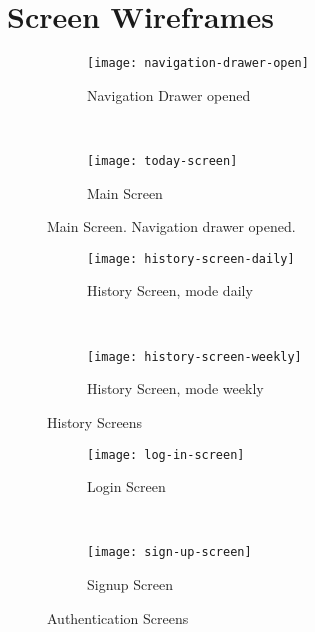 \chapter{Screen Wireframes}



\begin{figure*}[ht]
    \centering
    \begin{subfigure}[t]{0.4\textwidth}
        \centering
        \texttt{[image: navigation-drawer-open]}
        \caption{Navigation Drawer opened}
    \end{subfigure}%
    ~ 
    \begin{subfigure}[t]{0.4\textwidth}
        \centering
        \texttt{[image: today-screen]}
        \caption{Main Screen}
    \end{subfigure}
    \caption{Main Screen. Navigation drawer opened.}
\end{figure*}



\begin{figure*}[ht]
    \centering
    \begin{subfigure}[t]{0.4\textwidth}
        \centering
        \texttt{[image: history-screen-daily]}
        \caption{History Screen, mode daily}
    \end{subfigure}%
    ~ 
    \begin{subfigure}[t]{0.4\textwidth}
        \centering
        \texttt{[image: history-screen-weekly]}
        \caption{History Screen, mode weekly}
    \end{subfigure}
    \caption{History Screens}
\end{figure*}



\begin{figure*}[ht]
    \centering
    \begin{subfigure}[t]{0.4\textwidth}
        \centering
        \texttt{[image: log-in-screen]}
        \caption{Login Screen}
    \end{subfigure}%
    ~ 
    \begin{subfigure}[t]{0.4\textwidth}
        \centering
        \texttt{[image: sign-up-screen]}
        \caption{Signup Screen}
    \end{subfigure}
    \caption{Authentication Screens}
\end{figure*}



